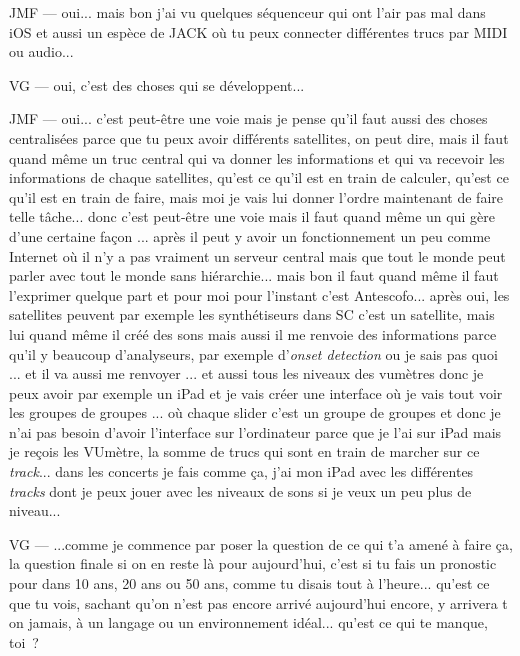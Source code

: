 JMF — oui... mais bon j'ai vu quelques séquenceur qui ont l'air pas mal dans iOS et aussi un espèce de JACK où tu peux connecter différentes trucs par MIDI ou audio...  

VG — oui, c'est des choses qui se développent... 

JMF — oui... c'est peut-être une voie mais je pense qu'il faut aussi des choses centralisées parce que tu peux avoir différents satellites, on peut dire, mais il faut quand même un truc central qui va donner les informations et qui va recevoir les informations de chaque satellites, qu'est ce qu'il est en train de calculer, qu'est ce qu'il est en train de faire, mais moi je vais lui donner l'ordre maintenant de faire telle tâche... donc c'est peut-être une voie mais il faut quand même un qui gère d'une certaine façon ... après il peut y avoir un fonctionnement un peu comme Internet où il n'y a pas vraiment un serveur central mais que tout le monde peut parler avec tout le monde sans hiérarchie... mais bon il faut quand même il faut l'exprimer quelque part et pour moi pour l'instant c'est Antescofo... après oui, les satellites peuvent par exemple les synthétiseurs dans SC c'est un satellite, mais lui quand même il créé des sons mais aussi il me renvoie des informations parce qu'il y beaucoup d'analyseurs, par exemple d'\textit{onset detection} ou je sais pas quoi ... et il va aussi me renvoyer ... et aussi tous les niveaux des vumètres donc je peux avoir par exemple un iPad et je vais créer une interface où je vais tout voir les groupes de groupes ... où chaque slider c'est un groupe de groupes et donc je n'ai pas besoin d'avoir l'interface sur l'ordinateur parce que je l'ai sur iPad mais je reçois les VUmètre, la somme de trucs qui sont en train de marcher sur ce \textit{track}... dans les concerts je fais comme ça, j'ai mon iPad avec les différentes \textit{tracks} dont je peux jouer avec les niveaux de sons si je veux un peu plus de niveau... 

VG — ...comme je commence par poser la question de ce qui t'a amené à faire ça, la question finale si on en reste là pour aujourd'hui, c'est si tu fais un pronostic pour dans 10 ans, 20 ans ou 50 ans, comme tu disais tout à l'heure... qu'est ce que tu vois, sachant qu'on n'est pas encore arrivé aujourd'hui encore, y arrivera t on jamais, à un langage ou un environnement idéal... qu'est ce qui te manque, toi ? 

